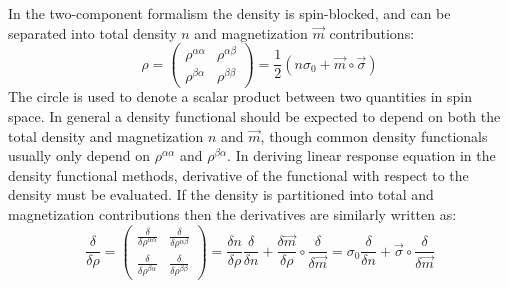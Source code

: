 \documentclass[12pt]{article}
\begin{document}
In the two-component formalism the density is spin-blocked, and can be separated into total density $n$ and magnetization $\vec{m}$ contributions:
\begin{equation}
 \rho = \begin{pmatrix} \rho^{\alpha\alpha} & \rho^{\alpha\beta} \\ \rho^{\beta\alpha} & \rho^{\beta\beta} \end{pmatrix} =
  \frac{1}{2}(n\sigma_0+\vec{m}\circ\vec{\sigma})
\end{equation}
The circle is used to denote a scalar product between two quantities in spin space.
In general a density functional should be expected to depend on both the total density and magnetization $n$ and $\vec{m}$, though common density functionals usually only depend on $\rho^{\alpha\alpha}$ and $\rho^{\beta\alpha}$.
In deriving linear response equation in the density functional methods, derivative of the functional with respect to the density must be evaluated. If the density is partitioned into total and magnetization contributions then the derivatives are similarly written as:
\begin{equation}
 \frac{\delta}{\delta\rho} = 
  \begin{pmatrix} \frac{\delta}{\delta\rho^{\alpha\alpha}} & \frac{\delta}{\delta\rho^{\alpha\beta}} \\
                  \frac{\delta}{\delta\rho^{\beta\alpha}}  & \frac{\delta}{\delta\rho^{\beta\beta}} \end{pmatrix}  
  = \frac{\delta n}{\delta\rho}\frac{\delta}{\delta n} + \frac{\delta \vec{m}}{\delta\rho}\circ\frac{\delta}{\delta \vec{m}} = 
    \sigma_0\frac{\delta}{\delta n} + \vec{\sigma}\circ\frac{\delta}{\delta\vec{m}}
\end{equation}
\end{document}
